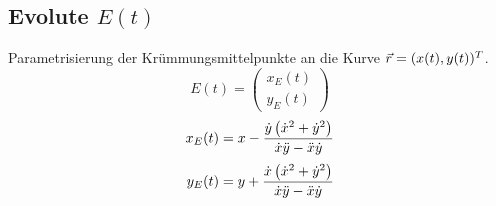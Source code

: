 \subsection{Evolute \texorpdfstring{\hfill $E(t)$}{E(t)}}
    Parametrisierung der Krümmungsmittelpunkte an die Kurve $\vec{r} = (x(t), y(t))^T$.
    $$
        E(t) = 
        \begin{pmatrix}
            x_E(t)\\y_E(t)
        \end{pmatrix}
    $$
    \begin{align*}
        x_E(t) &= x - \frac{\dot{y} \left( \dot{x}^2 + \dot{y}^2 \right)}{\dot{x} \ddot{y} - \ddot{x} \dot{y}}\\[0.25em]
        y_E(t) &= y + \frac{\dot{x} \left( \dot{x}^2 + \dot{y}^2 \right)}{\dot{x} \ddot{y} - \ddot{x} \dot{y}}
    \end{align*}
